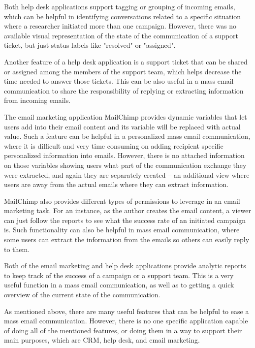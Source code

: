 \begin{compactitem}
	\item Both help desk applications support tagging or grouping of incoming emails, which can be helpful in identifying conversations related to a specific situation where a researcher initiated more than one campaign. However, there was no available visual representation of the state of the communication of a support ticket, but just status labels like "resolved" or "assigned".
	\item Another feature of a help desk application is a support ticket that can be shared or assigned among the members of the support team, which helps decrease the time needed to answer those tickets. This can be also useful in a mass email communication to share the responsibility of replying or extracting information from incoming emails.
	\item The email marketing application MailChimp provides dynamic variables that let users add into their email content and its variable will be replaced with actual value. Such a feature can be helpful in a personalized mass email communication, where it is difficult and very time consuming on adding recipient specific personalized information into emails. However, there is no attached information on those variables showing users what part of the communication exchange they were extracted, and again they are separately created -- an additional view where users are away from the actual emails where they can extract information.
	\item MailChimp also provides different types of permissions to leverage in an email marketing task. For an instance, as the author creates the email content, a viewer can just follow the reports to see what the success rate of an initiated campaign is. Such functionality can also be helpful in mass email communication, where some users can extract the information from the emails so others can easily reply to them.
	\item Both of the email marketing and help desk applications provide analytic reports to keep track of the success of a campaign or a support team. This is a very useful function in a mass email communication, as well as to getting a quick overview of the current state of the communication.
\end{compactitem}

As mentioned above, there are many useful features that can be helpful to ease a mass email communication. However, there is no one specific application capable of doing all of the mentioned features, or doing them in a way to support their main purposes, which are \ac{CRM}, help desk, and email marketing.

